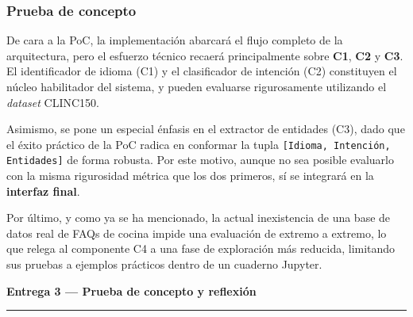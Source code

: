 \documentclass[11pt,a4paper,twoside]{article}
\theoremstyle{definition}
\numberwithin{equation}{section}
\begin{document}
\subsubsection*{Prueba de concepto}
De cara a la PoC, la implementación abarcará el flujo completo de la arquitectura, pero el esfuerzo técnico recaerá principalmente sobre \textbf{C1}, \textbf{C2} y \textbf{C3}. El identificador de idioma (C1) y el clasificador de intención (C2) constituyen el núcleo habilitador del sistema, y pueden evaluarse rigurosamente utilizando el \textit{dataset} CLINC150. 

Asimismo, se pone un especial énfasis en el extractor de entidades (C3), dado que el éxito práctico de la PoC radica en conformar la tupla \texttt{[Idioma, Intención, Entidades]} de forma robusta. Por este motivo, aunque no sea posible evaluarlo con la misma rigurosidad métrica que los dos primeros, sí se integrará en la \textbf{interfaz final}. 

Por último, y como ya se ha mencionado, la actual inexistencia de una base de datos real de FAQs de cocina impide una evaluación de extremo a extremo, lo que relega al componente C4 a una fase de exploración más reducida, limitando sus pruebas a ejemplos prácticos dentro de un cuaderno Jupyter.

\newpage


\begin{Large}
	\noindent \textbf{Entrega 3 --- Prueba de concepto y reflexión}
\end{Large}

\vspace{0.5pt}
\noindent \rule{\textwidth}{1pt}


\end{document}
